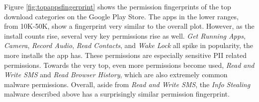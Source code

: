 


Figure \ref{fig:topappsfingerprint} shows the permission fingerprints of the top download categories on the Google Play Store. The apps in the lower ranges, from 10K-50K, show a fingerprint very similar to the overall plot. However, as the install counts rise, several very key permissions rise as well. \textit{Get Running Apps}, \textit{Camera}, \textit{Record Audio}, \textit{Read Contacts}, and \textit{Wake Lock} all spike in popularity, the more installs the app has. These permissions are especially sensitive PII related permissions. Towards the very top, even more permissions become used, \textit{Read and Write SMS} and \textit{Read Browser History}, which are also extremely common malware permissions. Overall, aside from \textit{Read and Write SMS}, the \textit{Info Stealing} malware described above has a surprisingly similar permission fingerprint.

